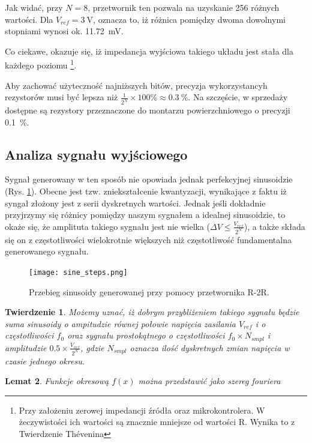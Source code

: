 \documentclass[12pt, a4paper]{article}
\newtheorem{theorem}{Twierdzenie}[section]
\newtheorem{lemma}[theorem]{Lemat}
\begin{document}
Jak widać, przy $N=8$, przetwornik ten pozwala na uzyskanie 256 różnych wartości. Dla $V_{ref}=\qty{3}{\volt}$,
oznacza to, iż różnica pomiędzy dwoma dowolnymi stopniami wynosi ok. \qty{11,72}{\mV}.

Co ciekawe, okazuje się, iż impedancja wyjściowa takiego układu jest stała dla każdego poziomu
\footnote{
	Przy założeniu zerowej impedancji źródła oraz mikrokontrolera. 
	W żeczywistości ich wartości są znacznie mniejsze od wartości R.
	Wynika to z Twierdzenie Thévenina
}.

Aby zachować użyteczność najniższych bitów, precyzja wykorzystancyh rezystorów musi być lepsza niż
$\frac{1}{2^N} \times 100\unit{\percent} \approx \qty{0,3}{\%}$. Na szczęście,
w sprzedaży dostępne są rezystory przeznaczone do montarzu powierzchniowego o precyzji \qty{0,1}{\%}.


\subsection{Analiza sygnału wyjściowego}

Sygnał generowany w ten sposób nie opowiada jednak perfekcyjnej sinusoidzie (Rys. \ref{fig:sine-stepped}).
Obecne jest tzw. zniekształcenie kwantyzacji, wynikające z faktu iż syngał złożony jest 
z serii dyskretnych wartości. Jednak jeśli dokładnie przyjrzymy się różnicy pomiędzy naszym sygnałem
a idealnej sinusoidzie, to okaże się, że amplituta takiego sygnału jest nie wielka 
($\Delta V \le \frac{V_{ref}}{2^N}$), a także składa się on z częstotliwości wielokrotnie większych niż
częstotliwość fundamentalna generowanego sygnału.

\begin{figure}[h]
	\centering
	\texttt{[image: sine\_steps.png]}
	\caption[short]{Przebieg sinusoidy generowanej przy pomocy przetwornika R-2R.}
	\label{fig:sine-stepped}
\end{figure}


\begin{theorem}
	Możemy uznać, iż dobrym przybliżeniem takiego sygnału będzie suma sinusoidy o ampitudzie równej połowie napięcia zasilania $V_{ref}$
i o częstotliwości $f_0$ oraz sygnału prostokątnego o częstotliwości $f_0 \times N_{smpl}$ i amplitudzie $0.5 \times \frac{V_{ref}}{2^N}$, 
gdzie $N_{smpl}$ oznacza ilość dyskretnych zmian napięcia w czasie jednego okresu.
\end{theorem}

\begin{lemma}
		Funkcje okresową $f(x)$ można przedstawić jako szereg fouriera
\end{lemma}
\end{document}
